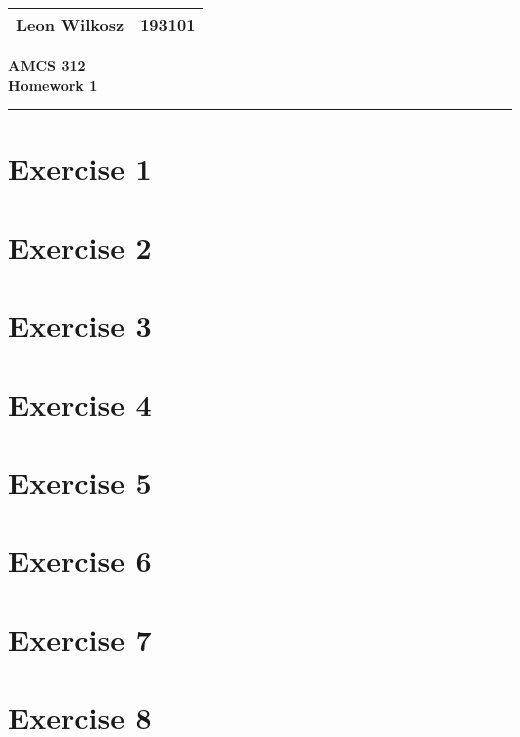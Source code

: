 \documentclass[
a4paper,
]{article}
\newcommand{\1}{\mathds{1}}
\begin{document}
	
	
	\begin{flushright}
		\begin{tabular}{|l|c|}
			\hline
			Leon Wilkosz & 193101 \\ \hline
		\end{tabular}
	\end{flushright}
	\begin{center}
		\Large \textbf{AMCS 312}\\ \medskip
		\large\textbf{Homework 1}\\
	\end{center}
	\medskip
	\hrule
	\vspace{10pt}

        \section*{Exercise 1}
		
		\null\newpage
		
        \section*{Exercise 2}
		
		\null\newpage
		
        \section*{Exercise 3}
		
		\null\newpage
		
        \section*{Exercise 4}
        
        \null\newpage
        
        \section*{Exercise 5}
        
        \null\newpage
        
        \section*{Exercise 6}
        
	    \null\newpage
        
		\section*{Exercise 7}
        
        \null\newpage
        
        \section*{Exercise 8}
        
        \null\newpage
        
\end{document}
